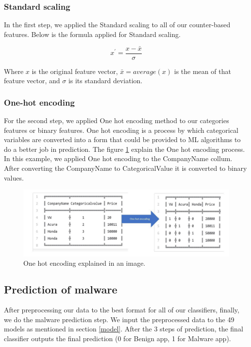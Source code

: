 \subsubsection{Standard scaling}
In the first step, we applied the Standard scaling to all of our counter-based features. Below is the formula applied for Standard scaling.

$$x^{\prime}=\frac{x-\bar{x}}{\sigma}$$

Where $x$ is the original feature vector, $\bar{x}=average(x)$ is the mean of that feature vector, and $\sigma$ is its standard deviation.

\subsubsection{One-hot encoding}
For the second step, we applied One hot encoding method to our categories features or binary features. 
One hot encoding is a process by which categorical variables are converted into a form that could be provided to ML algorithms to do a better job in prediction.
The figure \ref{fig:onehotexample} explain the One hot encoding process. In this example, we applied One hot encoding to the CompanyName collum. After converting the CompanyName to CategoricalValue it is converted to binary values.

\begin{figure}[htbp]
    \centering
    \includegraphics[width=\textwidth]{./Figure/onehotexample.png}
    \caption{One hot encoding explained in an image.}
    \label{fig:onehotexample}
\end{figure}

\subsection{Prediction of malware}

After preprocessing our data to the best format for all of our classifiers, finally, we do the malware prediction step.
We input the preprocessed data to the 49 models as mentioned in section \ref{model}.
After the 3 steps of prediction, the final classifier outputs the final prediction (0 for Benign app, 1 for Malware app).

